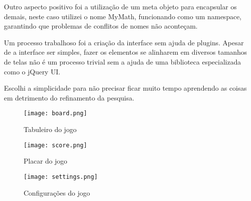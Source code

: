 \begin{draft}
Outro aspecto positivo foi a utilização de um meta objeto para
encapsular os demais, neste caso utilizei o nome MyMath, funcionando
como um namespace, garantindo que problemas de conflitos de nomes não
aconteçam.

Um processo trabalhoso foi a criação da interface sem ajuda de plugins.
Apesar de a interface ser simples, fazer os elementos se alinharem em 
diversos tamanhos de telas não é um processo trivial sem a ajuda de uma
biblioteca especializada como o jQuery UI.

Escolhi a simplicidade para não precisar ficar muito tempo aprendendo
as coisas em detrimento do refinamento da pesquisa.


\end{draft}
\begin{figure}
    \centering
    \texttt{[image: board.png]}
	\caption{Tabuleiro do jogo}
\end{figure}

\begin{figure}
    \centering
    \texttt{[image: score.png]}
	\caption{Placar do jogo}
\end{figure}

\begin{figure}
    \centering
    \texttt{[image: settings.png]}
	\caption{Configurações do jogo}
\end{figure}


